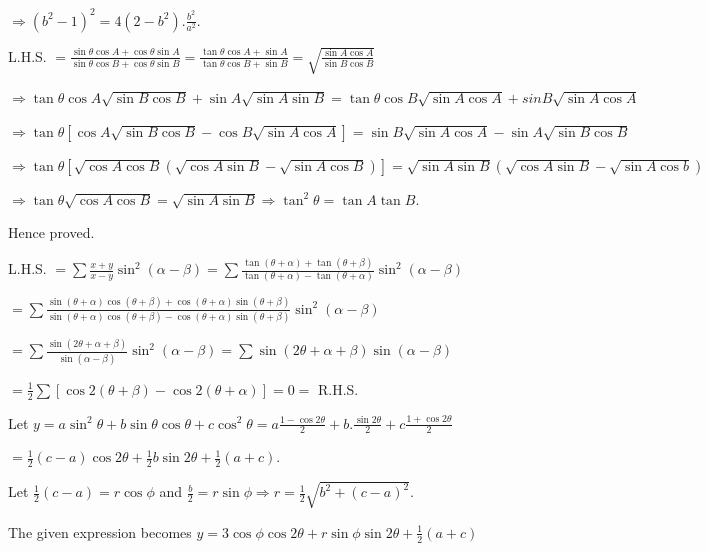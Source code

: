   $\Rightarrow \left(b^2 - 1\right)^2 = 4\left(2 - b^2\right).\frac{b^2}{a^2}$.
\item L.H.S. $= \frac{\sin\theta\cos A + \cos\theta\sin A}{\sin\theta\cos B + \cos\theta\sin B}
  = \frac{\tan\theta\cos A + \sin A}{\tan\theta\cos B + \sin B} = \sqrt{\frac{\sin A\cos A}{\sin B\cos B}}$

  $\Rightarrow \tan\theta\cos A\sqrt{\sin B\cos B} + \sin A\sqrt{\sin A\sin B} = \tan\theta\cos B\sqrt{\sin
    A\cos A} + sin B\sqrt{\sin A\cos A}$

  $\Rightarrow \tan\theta[\cos A\sqrt{\sin B\cos B} - \cos B\sqrt{\sin A\cos A}] = \sin B\sqrt{\sin A\cos A}
  - \sin A\sqrt{\sin B\cos B}$

  $\Rightarrow \tan\theta\left[\sqrt{\cos A\cos B}\left(\sqrt{\cos A\sin B} - \sqrt{\sin A\cos
      B}\right)\right] = \sqrt{\sin A\sin B}\left(\sqrt{\cos A\sin B} - \sqrt{\sin A\cos b}\right)$

  $\Rightarrow \tan\theta\sqrt{\cos A\cos B} = \sqrt{\sin A\sin B}\Rightarrow \tan^2\theta = \tan A\tan B$.

  Hence proved.
\item L.H.S. $= \displaystyle\sum \frac{x + y}{x - y}\sin^2(\alpha - \beta) = \sum \frac{\tan(\theta
  + \alpha) + \tan(\theta + \beta)}{\tan(\theta + \alpha) - \tan(\theta + \alpha)}\sin^2(\alpha - \beta)$

  $= \displaystyle\sum \frac{\sin(\theta + \alpha)\cos(\theta + \beta) + \cos(\theta + \alpha)\sin(\theta
  + \beta)}{\sin(\theta + \alpha)\cos(\theta + \beta) - \cos(\theta + \alpha)\sin(\theta
  + \beta)}\sin^2(\alpha - \beta)$

  $= \displaystyle\sum\frac{\sin(2\theta + \alpha + \beta)}{\sin(\alpha - \beta)}\sin^2(\alpha - \beta)
  = \sum\sin(2\theta + \alpha + \beta)\sin(\alpha - \beta)$

  $= \frac{1}{2}\sum \left[\cos2(\theta + \beta) - \cos2(\theta + \alpha)\right] = 0 =$ R.H.S.
\item Let $y = a\sin^2\theta + b\sin\theta\cos\theta + c\cos^2\theta = a\frac{1 - \cos2\theta}{2} +
  b.\frac{\sin2\theta}{2} + c\frac{1 + \cos2\theta}{2}$

  $= \frac{1}{2}(c - a)\cos2\theta + \frac{1}{2}b\sin2\theta + \frac{1}{2}(a + c)$.

  Let $\frac{1}{2}(c - a) = r\cos\phi$ and $\frac{b}{2} = r\sin\phi\Rightarrow r = \frac{1}{2}\sqrt{b^2 + (c
    - a)^2}$.

  The given expression becomes $y = 3\cos\phi\cos2\theta + r\sin\phi\sin2\theta + \frac{1}{2}(a + c)$

